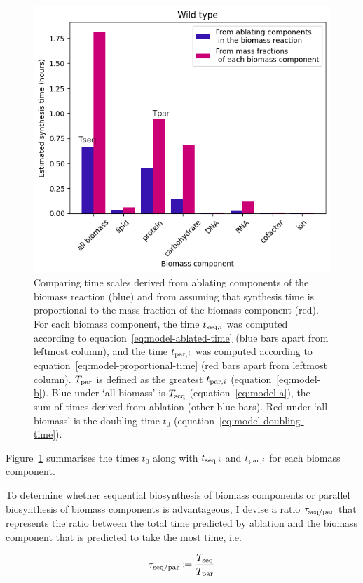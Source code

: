 \begin{figure}
  \centering
  \includegraphics[width=.9\linewidth]{ablation_example_ratio.png}
  \caption{
    Comparing time scales derived from ablating components of the biomass reaction (blue) and from assuming that synthesis time is proportional to the mass fraction of the biomass component (red).
    For each biomass component, the time $t_{\mathrm{seq},i}$ was computed according to equation~\ref{eq:model-ablated-time} (blue bars apart from leftmost column), and the time $t_{\mathrm{par},i}$ was computed according to equation~\ref{eq:model-proportional-time} (red bars apart from leftmost column).
    $T_{\mathrm{par}}$ is defined as the greatest $t_{\mathrm{par},i}$ (equation~\ref{eq:model-b}).
    Blue under `all biomass' is $T_{\mathrm{seq}}$ (equation~\ref{eq:model-a}), the sum of times derived from ablation (other blue bars).
    Red under `all biomass' is the doubling time $t_{0}$ (equation~\ref{eq:model-doubling-time}).
  }
  \label{fig:model-ablate-times}
\end{figure}

Figure~\ref{fig:model-ablate-times} summarises the times $t_{0}$ along with $t_{\mathrm{seq},i}$ and $t_{\mathrm{par},i}$ for each biomass component.

To determine whether sequential biosynthesis of biomass components or parallel biosynthesis of biomass components is advantageous, I devise a ratio $\tau_{\mathrm{seq}/\mathrm{par}}$ that represents the ratio between the total time predicted by ablation and the biomass component that is predicted to take the most time, i.e.\

\begin{equation}
  \tau_{\mathrm{seq}/\mathrm{par}} \coloneqq \frac{T_{\mathrm{seq}}}{T_{\mathrm{par}}}
  \label{eq:model-ratio-simplified}
\end{equation}

